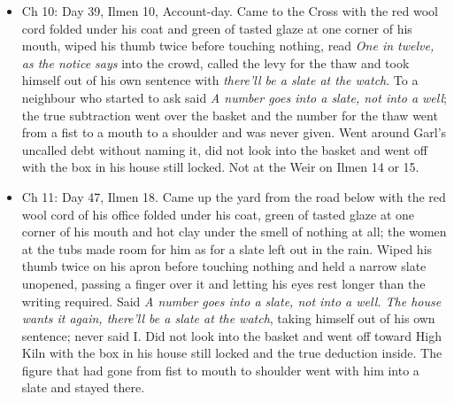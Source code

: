 \documentclass{design/chronicle}
\begin{document}
{\begin{itemize}[leftmargin=1.4em,itemsep=1pt,topsep=3pt,parsep=0pt]
\end{itemize}

\begin{itemize}[leftmargin=1.4em,itemsep=1pt,topsep=3pt,parsep=0pt]

\item Ch 10: Day 39, Ilmen 10, Account-day. Came to the Cross with the red wool cord folded under his coat and green of tasted glaze at one corner of his mouth, wiped his thumb twice before touching nothing, read \emph{One in twelve, as the notice says} into the crowd, called the levy for the thaw and took himself out of his own sentence with \emph{there’ll be a slate at the watch}. To a neighbour who started to ask said \emph{A number goes into a slate, not into a well}; the true subtraction went over the basket and the number for the thaw went from a fist to a mouth to a shoulder and was never given. Went around Garl’s uncalled debt without naming it, did not look into the basket and went off with the box in his house still locked. Not at the Weir on Ilmen 14 or 15.

\end{itemize}

\begin{itemize}[leftmargin=1.4em,itemsep=1pt,topsep=3pt,parsep=0pt]

\item Ch 11: Day 47, Ilmen 18. Came up the yard from the road below with the red wool cord of his office folded under his coat, green of tasted glaze at one corner of his mouth and hot clay under the smell of nothing at all; the women at the tubs made room for him as for a slate left out in the rain. Wiped his thumb twice on his apron before touching nothing and held a narrow slate unopened, passing a finger over it and letting his eyes rest longer than the writing required. Said \emph{A number goes into a slate, not into a well. The house wants it again, there’ll be a slate at the watch}, taking himself out of his own sentence; never said I. Did not look into the basket and went off toward High Kiln with the box in his house still locked and the true deduction inside. The figure that had gone from fist to mouth to shoulder went with him into a slate and stayed there.

\end{itemize}

\begin{itemize}[leftmargin=1.4em,itemsep=1pt,topsep=3pt,parsep=0pt]


\end{itemize}}
\end{document}
